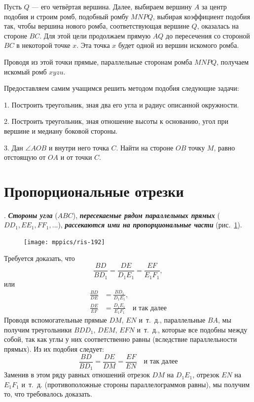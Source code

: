 \documentclass[oneside]{book}
\begin{document}
Пусть $Q$ — его четвёртая вершина.
Далее, выбираем вершину $A$ за центр подобия и строим ромб, подобный ромбу $MNPQ$, выбирая коэффициент подобия так, чтобы вершина нового ромба, соответствующая вершине $Q$, оказалась на стороне $BC$.
Для этой цели продолжаем прямую $AQ$ до пересечения со стороной $BC$ в некоторой точке $x$.
Эта точка $x$ будет одной из вершин искомого ромба.

Проводя из этой точки прямые, параллельные сторонам ромба $MNPQ$, получаем искомый ромб $xyzu$.

Предоставляем самим учащимся решить методом подобия следующие задачи:

1.
Построить треугольник, зная два его угла и радиус описанной окружности.

2.
Построить треугольник, зная отношение высоты к основанию, угол при вершине и медиану боковой стороны.

3.
Дан $\angle AOB$ и внутри него точка $C$.
Найти на стороне $OB$ точку $M$, равно отстоящую от $OA$ и от точки $C$.

\section{Пропорциональные отрезки} 

\paragraph{}\label{1938/182}
. %
\textbf{\emph{Стороны угла}} ($ABC$), \textbf{\emph{пересекаемые рядом параллельных прямых}} ($DD_1, EE_1, FF_1, \dots$), \textbf{\emph{рассекаются ими на пропорциональные части}} (рис.~\ref{1938/ris-192}).

\begin{figure}[h!]
\centering
\texttt{[image: mppics/ris-192]}
\caption{}\label{1938/ris-192}
\end{figure}

Требуется доказать, что
\[\frac{BD}{BD_1}=\frac{DE}{D_1E_1}=\frac{EF}{E_1F_1},\]
или
\begin{align*}
\frac{BD}{DE}&=\frac{BD_1}{D_1E_1},
\\
\frac{DE}{EF}&=\frac{D_1E_1}{E_1F_1}\quad\text{и так далее}
\end{align*}
Проводя вспомогательные прямые $DM$, $EN$ и~т.~д., параллельные $BA$, мы получим треугольники $BDD_1$, $DEM$, $EFN$ и~т.~д., которые все подобны между собой, так как углы у них соответственно равны (вследствие параллельности прямых).
Из их подобия следует:
\[\frac{BD}{BD_1}=\frac{DE}{DM}=\frac{EF}{EN}\quad\text{и так далее}\]
Заменив в этом ряду равных отношений отрезок $DM$ на $D_1E_1$, отрезок $EN$ на $E_1F_1$ и~т.~д.
(противоположные стороны параллелограммов равны), мы получим то, что требовалось доказать.
\end{document}

